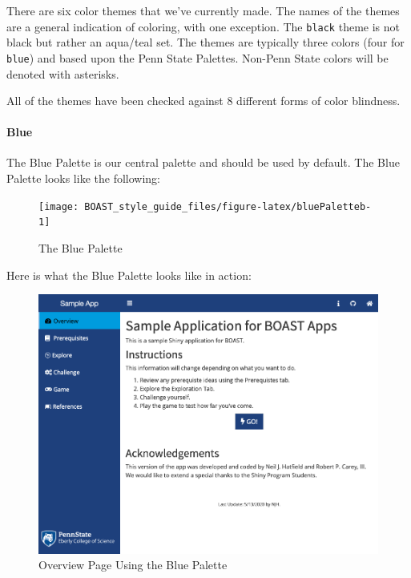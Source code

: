 \documentclass[
]{book}
\begin{document}
There are six color themes that we've currently made. The names of the themes are a general indication of coloring, with one exception. The \texttt{black} theme is not black but rather an aqua/teal set. The themes are typically three colors (four for \texttt{blue}) and based upon the Penn State Palettes. Non-Penn State colors will be denoted with asterisks.

All of the themes have been checked against 8 different forms of color blindness.

\hypertarget{blue-1}{%
\paragraph{Blue}\label{blue-1}}

The Blue Palette is our central palette and should be used by default. The Blue Palette looks like the following:

\begin{figure}

{\centering \texttt{[image: BOAST\_style\_guide\_files/figure-latex/bluePaletteb-1]} 

}

\caption{The Blue Palette}\label{fig:bluePaletteb}
\end{figure}

Here is what the Blue Palette looks like in action:

\begin{figure}

{\centering \includegraphics[width=13.26in]{images/colorThemes/blueOverview} 

}

\caption{Overview Page Using the Blue Palette}\label{fig:blueAction1b}
\end{figure}
\end{document}
